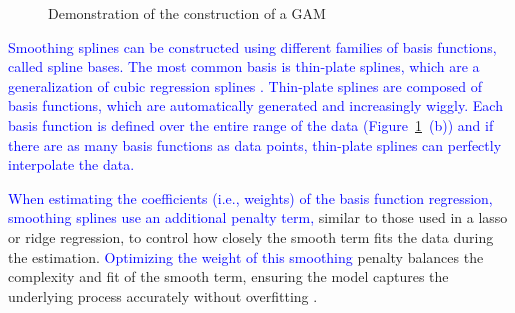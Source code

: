 \documentclass[man, floatsintext]{apa7}
\begin{document}
\begin{figure}[!t]
  \caption{Demonstration of the construction of a GAM}
  \label{fig:gam_dem}
\end{figure}

\textcolor{blue}{ Smoothing splines can be constructed using different families
  of basis functions, called spline bases.  The most common
  basis is thin-plate splines, which are a generalization of
  cubic regression splines \parencite{wood_generalized_2006}. Thin-plate
  splines are composed of basis functions, which are automatically
  generated and increasingly wiggly. Each basis function is defined over the
  entire range of the data (Figure~\ref{fig:gam_dem}~(b)) and if there are
  as many basis functions as data points, thin-plate splines can perfectly
  interpolate the data.}

\textcolor{blue}{ When estimating the coefficients (i.e., weights) of the basis
  function regression, smoothing splines use an additional penalty term, }
similar to those used in a lasso or ridge regression, to control how closely
the smooth term fits the data during the estimation.
\textcolor{blue}{Optimizing the weight of this smoothing} penalty balances the
complexity and fit of the smooth term, ensuring the model captures the
underlying process accurately without overfitting
\parencite{gu_smoothing_2013, wahba_spline_1980}.
\end{document}
